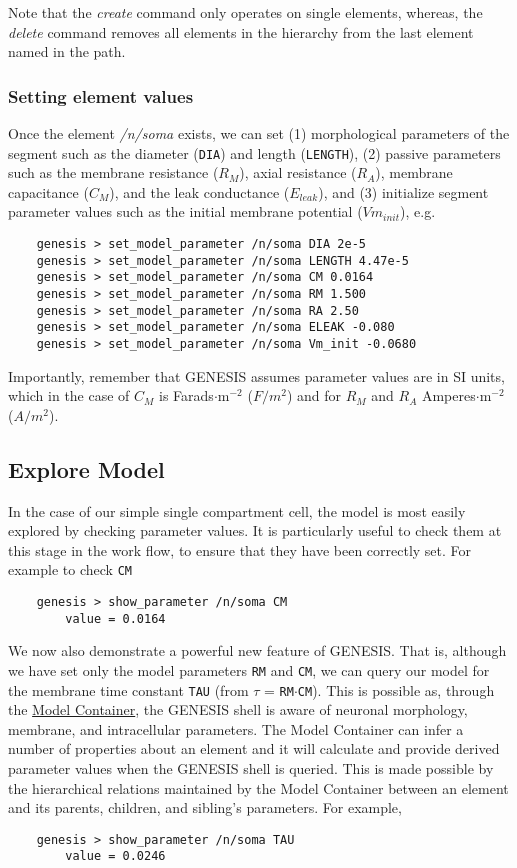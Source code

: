 \documentclass[12pt]{article}
\begin{document}
Note that the {\it create} command only operates on single elements, whereas, the {\it delete} command removes all elements in the hierarchy from the last element named in the path.

\subsubsection*{Setting element values}

Once the element {\it /n/soma} exists, we can set (1) morphological  parameters of the segment such as the diameter ({\tt DIA}) and length ({\tt LENGTH}), (2) passive parameters such as  the membrane resistance ($R_M$), axial resistance ($R_A$), membrane capacitance ($C_M$), and the leak conductance ($E_{leak}$), and (3) initialize segment parameter values such as the initial membrane potential ($Vm_{init}$), e.g.
\begin{verbatim}
    genesis > set_model_parameter /n/soma DIA 2e-5
    genesis > set_model_parameter /n/soma LENGTH 4.47e-5
    genesis > set_model_parameter /n/soma CM 0.0164
    genesis > set_model_parameter /n/soma RM 1.500
    genesis > set_model_parameter /n/soma RA 2.50
    genesis > set_model_parameter /n/soma ELEAK -0.080
    genesis > set_model_parameter /n/soma Vm_init -0.0680
\end{verbatim}

Importantly, remember that GENESIS assumes parameter values are in SI units, which in the case of $C_M$ is Farads$\cdot$m$^{-2}$ ($F/m^2$) and for $R_M$ and $R_A$ Amperes$\cdot$m$^{-2}$ ($A/m^2$).

\subsection*{Explore Model}

In the case of our simple single compartment cell, the model is most easily explored by checking parameter values. It is particularly useful to check them at this stage in the work flow, to ensure that they have been correctly set. For example to check {\tt CM}
\begin{verbatim}
    genesis > show_parameter /n/soma CM
        value = 0.0164
\end{verbatim}

We now also demonstrate a powerful new feature of GENESIS. That is, although we have set only the model parameters {\tt RM} and {\tt CM}, we can query our model for the membrane time constant {\tt TAU} (from $\tau$ = {\tt RM}$\cdot${\tt CM}). This is possible as, through the \href{../model-container/model-container.tex}{Model Container}, the GENESIS shell is aware of neuronal morphology, membrane, and intracellular parameters. The Model Container can infer a number of properties about an element and it will calculate and provide derived parameter values when the GENESIS shell is queried. This is made possible by the hierarchical relations maintained by the Model Container between an element and its parents, children, and sibling's parameters. For example,
\begin{verbatim}
    genesis > show_parameter /n/soma TAU
        value = 0.0246
\end{verbatim}
\end{document}
